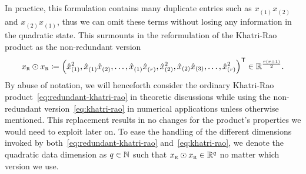 In practice, this formulation contains many duplicate entries such as $x_{(1)}^{\phantom{1}} x_{(2)}^{\phantom{1}}$ and $x_{(2)}^{\phantom{1}} x_{(1)}^{\phantom{1}}$, thus we can omit these terms without losing any information in the quadratic state.
This surmounts in the reformulation of the Khatri-Rao product as the non-redundant version
\begin{equation}\label{eq:khatri-rao}
    x_{\textnormal{\scshape r}} \odot x_{\textnormal{\scshape r}} \coloneqq {\left( \hat{x}_{(1)}^2, \hat{x}_{(1)}^{\phantom{1}} \hat{x}_{(2)}^{\phantom{1}}, \dots, \hat{x}_{(1)}^{\phantom{1}} \hat{x}_{(r)}^{\phantom{1}}, \hat{x}_{(2)}^2, \hat{x}_{(2)} \hat{x}_{(3)}, \dots, \hat{x}_{(r)}^2 \right)}^{\mkern1mu \mathsf{T}} \in \mathbb{R}^{\frac{r (r + 1)}{2}}.
\end{equation}
By abuse of notation, we will henceforth consider the ordinary Khatri-Rao product~\eqref{eq:redundant-khatri-rao} in theoretic discussions while using the non-redundant version~\eqref{eq:khatri-rao} in numerical applications unless otherwise mentioned.
This replacement results in no changes for the product's properties we would need to exploit later on.
To ease the handling of the different dimensions invoked by both~\eqref{eq:redundant-khatri-rao} and~\eqref{eq:khatri-rao}, we denote the quadratic data dimension as $q \in \mathbb{N}$ such that $x_{\textnormal{\scshape r}} \odot x_{\textnormal{\scshape r}} \in \mathbb{R}^q$ no matter which version we use.


